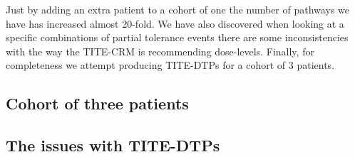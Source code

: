 Just by adding an extra patient to a cohort of one the number of pathways we have has increased almost 20-fold. We have also discovered when looking at a specific combinations of partial tolerance events there are some inconsistencies with the way the TITE-CRM is recommending dose-levels. Finally, for completeness we attempt producing TITE-DTPs for a cohort of 3 patients.   


\subsection{Cohort of three patients}



\subsection{The issues with TITE-DTPs}

